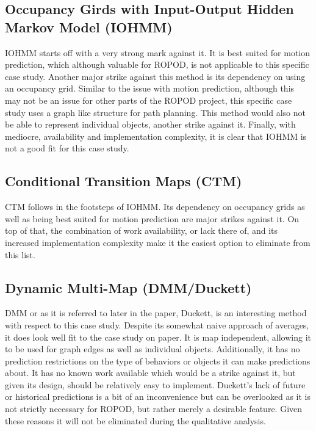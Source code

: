   \subsection { Occupancy Girds with Input-Output Hidden Markov Model (IOHMM) }
  IOHMM starts off with a very strong mark against it. It is best suited for
  motion prediction, which although valuable for ROPOD, is not applicable to
  this specific case study. Another major strike against this method is its
  dependency on using an occupancy grid. Similar to the issue with motion
  prediction, although this may not be an issue for other parts of the ROPOD
  project, this specific case study uses a graph like structure for path
  planning. This method would also not be able to represent individual objects,
  another strike against it. Finally, with mediocre, availability and
  implementation complexity, it is clear that IOHMM is not a good fit for this
  case study.

  \subsection { Conditional Transition Maps (CTM) }
  CTM follows in the footsteps of IOHMM. Its dependency on occupancy grids as
  well as being best suited for motion prediction are major strikes against it.
  On top of that, the combination of work availability, or lack there of, and
  its increased implementation complexity make it the easiest option to
  eliminate from this list.

  \subsection { Dynamic Multi-Map (DMM/Duckett) }
  DMM or as it is referred to later in the paper, Duckett, is an interesting
  method with respect to this case study. Despite its somewhat naive approach
  of averages, it does look well fit to the case study on paper. It is map
  independent, allowing it to be used for graph edges as well as individual
  objects. Additionally, it has no prediction restrictions on the type of
  behaviors or objects it can make predictions about. It has no known work
  available which would be a strike against it, but given its design, should
  be relatively easy to implement. Duckett's lack of future or historical
  predictions is a bit of an inconvenience but can be overlooked as it is not
  strictly necessary for ROPOD, but rather merely a desirable feature. Given
  these reasons it will not be eliminated during the qualitative analysis.

